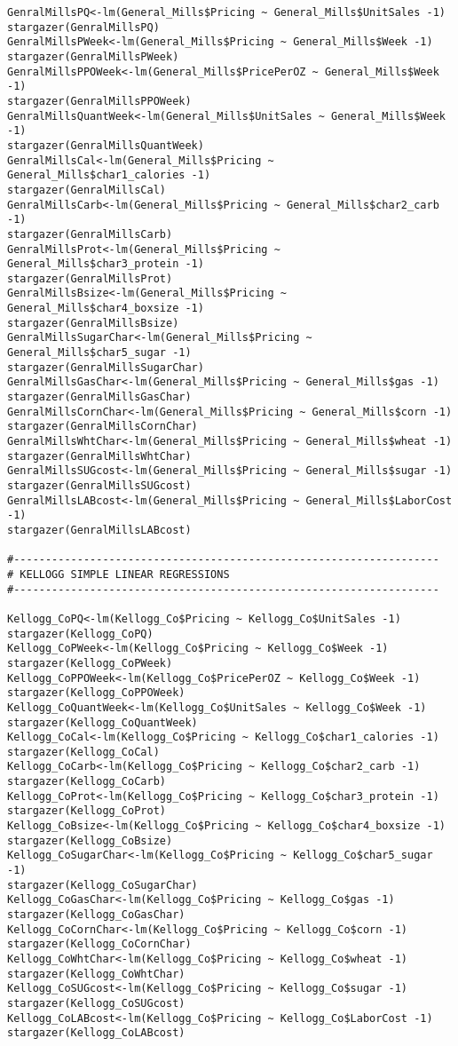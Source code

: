 \documentclass[12pt,english]{article}
\begin{document}
\begin{lstlisting}
GenralMillsPQ<-lm(General_Mills$Pricing ~ General_Mills$UnitSales -1)
stargazer(GenralMillsPQ)
GenralMillsPWeek<-lm(General_Mills$Pricing ~ General_Mills$Week -1)
stargazer(GenralMillsPWeek)
GenralMillsPPOWeek<-lm(General_Mills$PricePerOZ ~ General_Mills$Week -1)
stargazer(GenralMillsPPOWeek)
GenralMillsQuantWeek<-lm(General_Mills$UnitSales ~ General_Mills$Week -1)
stargazer(GenralMillsQuantWeek)
GenralMillsCal<-lm(General_Mills$Pricing ~ General_Mills$char1_calories -1)
stargazer(GenralMillsCal)
GenralMillsCarb<-lm(General_Mills$Pricing ~ General_Mills$char2_carb -1)
stargazer(GenralMillsCarb)
GenralMillsProt<-lm(General_Mills$Pricing ~ General_Mills$char3_protein -1)
stargazer(GenralMillsProt)
GenralMillsBsize<-lm(General_Mills$Pricing ~ General_Mills$char4_boxsize -1)
stargazer(GenralMillsBsize)
GenralMillsSugarChar<-lm(General_Mills$Pricing ~ General_Mills$char5_sugar -1)
stargazer(GenralMillsSugarChar)
GenralMillsGasChar<-lm(General_Mills$Pricing ~ General_Mills$gas -1)
stargazer(GenralMillsGasChar)
GenralMillsCornChar<-lm(General_Mills$Pricing ~ General_Mills$corn -1)
stargazer(GenralMillsCornChar)
GenralMillsWhtChar<-lm(General_Mills$Pricing ~ General_Mills$wheat -1)
stargazer(GenralMillsWhtChar)
GenralMillsSUGcost<-lm(General_Mills$Pricing ~ General_Mills$sugar -1)
stargazer(GenralMillsSUGcost)
GenralMillsLABcost<-lm(General_Mills$Pricing ~ General_Mills$LaborCost -1)
stargazer(GenralMillsLABcost)

#-------------------------------------------------------------------
# KELLOGG SIMPLE LINEAR REGRESSIONS
#-------------------------------------------------------------------

Kellogg_CoPQ<-lm(Kellogg_Co$Pricing ~ Kellogg_Co$UnitSales -1)
stargazer(Kellogg_CoPQ)
Kellogg_CoPWeek<-lm(Kellogg_Co$Pricing ~ Kellogg_Co$Week -1)
stargazer(Kellogg_CoPWeek)
Kellogg_CoPPOWeek<-lm(Kellogg_Co$PricePerOZ ~ Kellogg_Co$Week -1)
stargazer(Kellogg_CoPPOWeek)
Kellogg_CoQuantWeek<-lm(Kellogg_Co$UnitSales ~ Kellogg_Co$Week -1)
stargazer(Kellogg_CoQuantWeek)
Kellogg_CoCal<-lm(Kellogg_Co$Pricing ~ Kellogg_Co$char1_calories -1)
stargazer(Kellogg_CoCal)
Kellogg_CoCarb<-lm(Kellogg_Co$Pricing ~ Kellogg_Co$char2_carb -1)
stargazer(Kellogg_CoCarb)
Kellogg_CoProt<-lm(Kellogg_Co$Pricing ~ Kellogg_Co$char3_protein -1)
stargazer(Kellogg_CoProt)
Kellogg_CoBsize<-lm(Kellogg_Co$Pricing ~ Kellogg_Co$char4_boxsize -1)
stargazer(Kellogg_CoBsize)
Kellogg_CoSugarChar<-lm(Kellogg_Co$Pricing ~ Kellogg_Co$char5_sugar -1)
stargazer(Kellogg_CoSugarChar)
Kellogg_CoGasChar<-lm(Kellogg_Co$Pricing ~ Kellogg_Co$gas -1)
stargazer(Kellogg_CoGasChar)
Kellogg_CoCornChar<-lm(Kellogg_Co$Pricing ~ Kellogg_Co$corn -1)
stargazer(Kellogg_CoCornChar)
Kellogg_CoWhtChar<-lm(Kellogg_Co$Pricing ~ Kellogg_Co$wheat -1)
stargazer(Kellogg_CoWhtChar)
Kellogg_CoSUGcost<-lm(Kellogg_Co$Pricing ~ Kellogg_Co$sugar -1)
stargazer(Kellogg_CoSUGcost)
Kellogg_CoLABcost<-lm(Kellogg_Co$Pricing ~ Kellogg_Co$LaborCost -1)
stargazer(Kellogg_CoLABcost)


\end{lstlisting}
\end{document}
